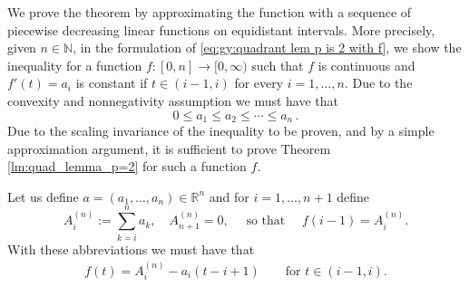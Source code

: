 \documentclass[10pt,leqno]{amsart}
\makeatletter
\newcommand{\R}[0]{\mathbb{R}}
\numberwithin{Theorem}{section}
\theoremstyle{definition}
\theoremstyle{remark}
\numberwithin{equation}{section}
\numberwithin{equation}{section}
\newenvironment{customproof}[1]{%
  \par\pushQED{\qed}%
  \normalfont\topsep6pt \trivlist
  \item[\hskip\labelsep\itshape
    Proof of #1\@addpunct{.}]\ignorespaces
}{%
  \popQED\endtrivlist\@endpefalse
}
\makeatother
\begin{document}
\begin{customproof}{Theorem \ref{lm:quad_lemma_p=2}}
We prove the theorem by approximating the function with a sequence of piecewise decreasing linear functions on equidistant intervals. More precisely, given $n\in\mathbb{N}$, in the formulation of \eqref{eq:gy:quadrant lem p is 2 with f}, we show the inequality for a function $f:[0,n]\to [0,\infty)$ such that $f$ is continuous and $f'(t)=a_i$ is constant if $t\in (i-1,i)$ for every $i=1,\ldots,n.$ Due to the convexity and nonnegativity assumption we must have that
$$
  0\leq a_1\leq a_2\leq\cdots\leq a_n\,.
$$
Due to the scaling invariance of the inequality to be proven, and by a simple approximation argument, it is sufficient to prove Theorem \ref{lm:quad_lemma_p=2} for such a function $f.$

Let us define $a=(a_1,\dots,a_n) \in \R^n$ and for $i = 1, \dots, n+1$ define
\[
A_i^{(n)} :=\sum_{k=i}^{n} a_k, \quad A_{n+1}^{(n)}=0,\quad\text{ so that }\quad f(i-1)=A_i^{(n)}.
\]
With these abbreviations we must have that
\begin{align}
    f(t)= A_i^{(n)} - a_i (t - i +1 ) \qquad \text{for }t\in (i-1, i).
\end{align}



\end{customproof}
\end{document}
